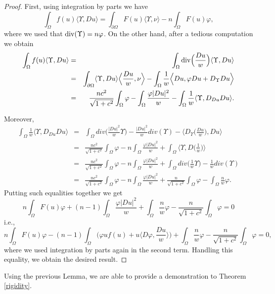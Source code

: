 \documentclass[12pt]{amsart}
\theoremstyle{plain}
\numberwithin{equation}{section}
\begin{document}
\begin{proof}
First, using integration by parts we have
\[
\int_\Omega f(u)\langle \Upsilon, Du\rangle = \int_{\partial\Omega}F(u)\langle\Upsilon, \nu\rangle - n\int_\Omega F(u)\varphi,
\]
where we used that ${\rm div}(\Upsilon)=n\varphi$.
On the other hand, after a tedious computation we obtain
\begin{eqnarray*}
\int_\Omega f(u)\langle \Upsilon, Du\rangle &=&\int_\Omega {\rm div}\Big(\frac{Du}{w}\Big)\langle\Upsilon, Du\rangle\\
&=& \int_{\partial\Omega}\langle\Upsilon, Du\rangle\Big\langle \frac{Du}{w}, \nu\Big\rangle - \int_\Omega\frac{1}{w}\Big\langle Du, \varphi Du + D_\Upsilon Du\Big\rangle \\
&=& \frac{nc^2}{\sqrt{1+c^2}}\int_\Omega \varphi - \int_\Omega\frac{\varphi |Du|^2}{w} - \int_\Omega\frac{1}{w}\langle \Upsilon, D_{Du}Du\rangle.
\end{eqnarray*}

Moreover,
\begin{eqnarray*}
\int_\Omega\frac{1}{w}\langle \Upsilon, D_{Du}Du\rangle &=&\int_\Omega div\Big(\frac{|Du|^2}{w}\Upsilon\Big) - \frac{|Du|^2}{w}div(\Upsilon) - \Big\langle D_\Upsilon\Big(\frac{Du}{w}\Big), Du\Big\rangle\\
&=&\frac{nc^2}{\sqrt{1+c^2}}\int_\Omega\varphi - n\int_\Omega\frac{\varphi |Du|^2}{w} + \int_\Omega\Big\langle \Upsilon, D\Big(\frac{1}{w}\Big)\Big\rangle\\
&=& \frac{nc^2}{\sqrt{1+c^2}}\int_\Omega\varphi - n\int_\Omega\frac{\varphi |Du|^2}{w} + \int_\Omega div\Big(\frac{1}{w}\Upsilon\Big) - \frac{1}{w}div(\Upsilon) \\
&=& \frac{nc^2}{\sqrt{1+c^2}}\int_\Omega\varphi - n\int_\Omega\frac{\varphi |Du|^2}{w} + \frac{n}{\sqrt{1+c^2}}\int_\Omega\varphi - \int_\Omega\frac{n}{w}\varphi.
\end{eqnarray*}
Putting such equalities together we get
\[
n\int_\Omega F(u)\varphi + (n-1)\int_\Omega \frac{\varphi |Du|^2}{w} +\int_\Omega \frac{n}{w}\varphi - \frac{n}{\sqrt{1+c^2}}\int_\Omega\varphi=0
\]
i.e.,
\[
n\int_\Omega F(u)\varphi - (n-1)\int_\Omega \Big(\varphi uf(u) + u\Big\langle D\varphi, \frac{Du}{w}\Big\rangle\Big) +\int_\Omega \frac{n}{w}\varphi - \frac{n}{\sqrt{1+c^2}}\int_\Omega\varphi=0,
\]
where we used integration by parts again in the second term. Handling this equality, we obtain the desired result.

\end{proof}

Using the previous Lemma, we are able to provide a demonstration to Theorem \ref{rigidity}.
\end{document}
